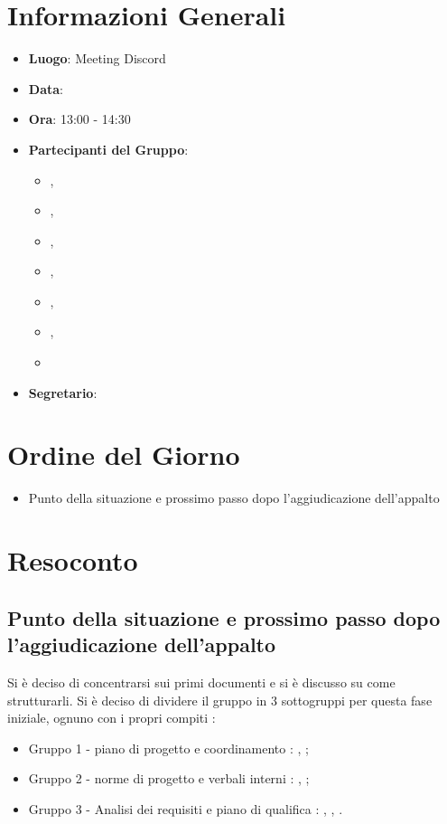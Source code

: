 \section{Informazioni Generali}

\begin{itemize}
\item{\textbf{Luogo}}: Meeting Discord
\item{\textbf{Data}}: \D{}
\item{\textbf{Ora}}: 13:00 - 14:30
\item{\textbf{Partecipanti del Gruppo}}: 
	\begin{itemize}
	\item{\EP{},} 
	\item{\FP{},}
	\item{\GC{},}
	\item{\LW{},}
	\item{\MB{},}
	\item{\MG{},}
	\item{\PV{}}
	\end{itemize} 
\item{\textbf{Segretario}}: \PV{}	
\end{itemize}

\section{Ordine del Giorno}
\begin{itemize}
\item{Punto della situazione e prossimo passo dopo l'aggiudicazione dell'appalto}
\end{itemize}

\section{Resoconto}

\subsection{Punto della situazione e prossimo passo dopo l'aggiudicazione dell'appalto}

Si è deciso di concentrarsi sui primi documenti e si è discusso su come strutturarli. Si è deciso di dividere il gruppo in 3 sottogruppi per questa fase iniziale, ognuno con i propri compiti : 

\begin{itemize}
\item{Gruppo 1 - piano di progetto e coordinamento : \EP{}, \MB{};}
\item{Gruppo 2 - norme di progetto e verbali interni : \PV{}, \MG{};}
\item{Gruppo 3 - Analisi dei requisiti e piano di qualifica : \FP{}, \GC{}, \LW{}.}
\end{itemize}

